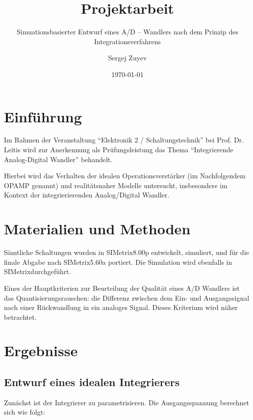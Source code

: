 \documentclass[
	ngerman,
	parskip=half,
	headsepline,
	twocolumn,
	DIV=calc,
	listof=leveldown,
	]{scrartcl}
\author{Sergej Zuyev}
\title{Projektarbeit}
\subtitle{Simuationsbasierter Entwurf eines A/D – Wandlers nach dem Prinzip des Integrationsverfahrens}
\date{\today}
\begin{document}
	
	\maketitle
	

	\clearpage
	
	\begin{abstract}		
		
	\end{abstract}
	
	\section{Einführung}	
	
		Im Rahmen der Veranstaltung \enquote{Elektronik 2 / Schaltungstechnik} bei Prof. Dr. Leitis wird zur Anerkennung als Prüfungsleistung das Thema \enquote{Integrierende Analog-Digital Wandler} behandelt.
		
		Hierbei wird das Verhalten der idealen Operationsverstärker (im Nachfolgendem OPAMP genannt) und realitätsnaher Modelle untersucht, insbesondere im Kontext der integrierierenden Analog/Digital Wandler.
	
	\section{Materialien und Methoden}
		
		Sämtliche Schaltungen wurden in SIMetrix\texttrademark 8.00p entwickelt,  simuliert, und für die finale Abgabe nach SIMetrix\texttrademark 5.60a portiert.
		Die Simulation wird ebenfalls in SIMetrix\texttrademark durchgeführt. 
		
		Eines der Hauptkriterien zur Beurteilung der Qualität eines A/D Wandlers ist das Quantisierungsrauschen: die Differenz zwischen dem Ein- und Ausgangssignal nach einer Rückwandlung in ein analoges Signal. 
		Dieses Kriterium wird näher betrachtet. 
		 
	\section{Ergebnisse}
		\subsection{Entwurf eines idealen Integrierers}
		\label{sec:ideal_integrator}
		Zunächst ist der Integrierer zu parametrisieren.		
		Die Ausgangsspannung berechnet sich wie folgt:
		
\end{document}
